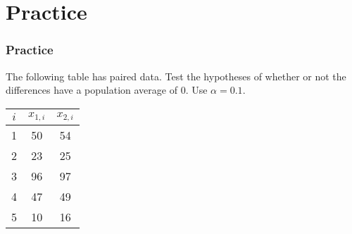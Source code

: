 \documentclass[11pt,containsverbatim,handout]{beamer}
\begin{document}
\section{Practice}
\begin{frame}
\frametitle{Practice}
The following table has paired data. Test the hypotheses of whether or not the differences have a population average of 0. Use $\alpha=0.1$. 
\begin{center}
\begin{tabular}{|c|c|c|} \hline
$i$    & $x_{1,i}$ & $x_{2,i}$ \\ \hline
1   & 50     & 54  \\  
2   & 23     & 25  \\  
3   & 96     & 97  \\  
4   & 47     & 49  \\  
5   & 10     & 16   \\  \hline
\end{tabular}
\end{center} \pause
\end{frame}
\vfill
\end{document}
